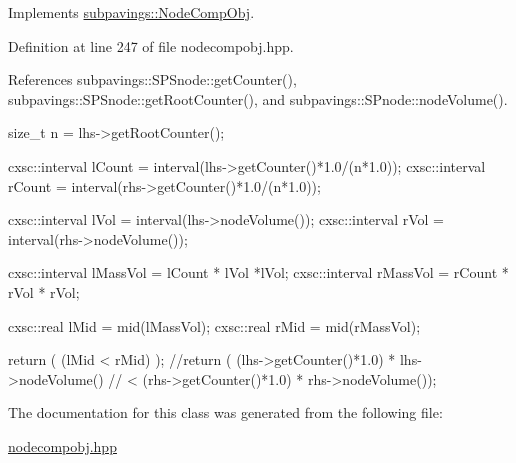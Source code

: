 \-Implements \hyperlink{classsubpavings_1_1NodeCompObj_a121d53049c5ed1c0924313951d6aa630}{subpavings\-::\-Node\-Comp\-Obj}.



\-Definition at line 247 of file nodecompobj.\-hpp.



\-References subpavings\-::\-S\-P\-Snode\-::get\-Counter(), subpavings\-::\-S\-P\-Snode\-::get\-Root\-Counter(), and subpavings\-::\-S\-Pnode\-::node\-Volume().


\begin{DoxyCode}
      { 
        size_t n = lhs->getRootCounter();
        
        cxsc::interval lCount = interval(lhs->getCounter()*1.0/(n*1.0));
        cxsc::interval rCount = interval(rhs->getCounter()*1.0/(n*1.0));
        
        cxsc::interval lVol = interval(lhs->nodeVolume());
        cxsc::interval rVol = interval(rhs->nodeVolume());
        
        cxsc::interval lMassVol = lCount * lVol *lVol;
        cxsc::interval rMassVol = rCount * rVol * rVol;
       
        cxsc::real lMid = mid(lMassVol);
        cxsc::real rMid = mid(rMassVol);

        return ( (lMid < rMid) );
        //return ( (lhs->getCounter()*1.0) * lhs->nodeVolume() 
        //      < (rhs->getCounter()*1.0) * rhs->nodeVolume()); 
    }
\end{DoxyCode}


\-The documentation for this class was generated from the following file\-:\begin{DoxyCompactItemize}
\item 
\hyperlink{nodecompobj_8hpp}{nodecompobj.\-hpp}\end{DoxyCompactItemize}
